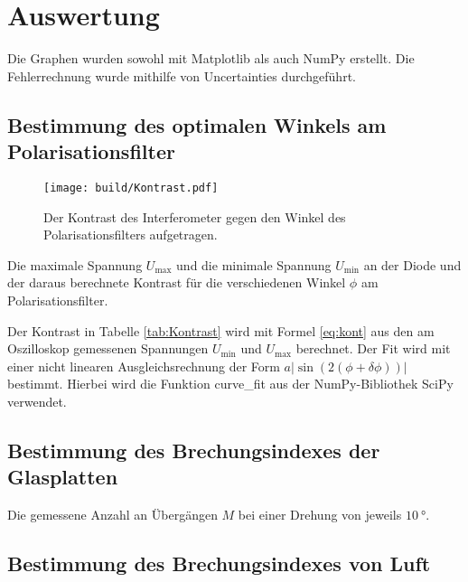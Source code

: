 \section{Auswertung}
\label{sec:Auswertung}
Die Graphen wurden sowohl mit Matplotlib \cite{matplotlib} als auch NumPy \cite{numpy} erstellt. Die
Fehlerrechnung wurde mithilfe von Uncertainties \cite{uncertainties} durchgeführt.
\subsection{Bestimmung des optimalen Winkels am Polarisationsfilter}
\begin{figure}
	\centering
	\texttt{[image: build/Kontrast.pdf]}
	\caption{Der Kontrast des Interferometer gegen den Winkel des Polarisationsfilters aufgetragen.}
\end{figure}
\begin{table}
	\centering
	\caption{Die maximale Spannung $U_\text{max}$ und die minimale Spannung $U_\text{min}$ an der Diode und der daraus berechnete Kontrast für die verschiedenen Winkel $\phi$ am Polarisationsfilter.}
	
\end{table}
Der Kontrast in Tabelle \ref{tab:Kontrast} wird mit Formel \eqref{eq:kont} aus den am Oszilloskop gemessenen Spannungen $U_\text{min}$ und $U_\text{max}$ berechnet. Der Fit wird mit einer nicht linearen Ausgleichsrechnung der Form $a |\sin(2(\phi+\delta\phi))|$ bestimmt. Hierbei wird die Funktion curve\_fit aus der NumPy-Bibliothek SciPy \cite{scipy} verwendet.

\subsection{Bestimmung des Brechungsindexes der Glasplatten}
\begin{table}
	\centering
	\caption{Die gemessene Anzahl an Übergängen $M$ bei einer Drehung von jeweils $\SI{10}{\degree}$.}
	
\end{table}

\subsection{Bestimmung des Brechungsindexes von Luft}

